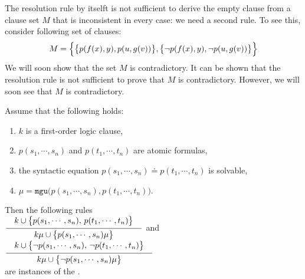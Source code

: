 The resolution rule by itselft is not sufficient to derive the empty clause from a clause set $M$ that is
inconsistent in every case: we need a second rule. To see this, consider following set of clauses:
\[ M = \Bigl\{ \bigl\{p(f(x),y), p(u,g(v))\bigr\}, 
               \bigl\{\neg p(f(x),y), \neg p(u,g(v))\bigr\} \Bigr\} 
\]
We will soon show that the set $M$ is contradictory. It can be shown that the resolution rule is not
sufficient to prove that $M$ is contradictory.
However, we will soon see that $M$ is contradictory. 

\begin{Definition} 
  Assume that the following holds:
  \begin{enumerate}
  \item $k$ is a first-order logic clause,
  \item $p(s_1,\cdots,s_n)$ and $p(t_1,\cdots,t_n)$ are atomic formulas,
  \item the syntactic equation $p(s_1,\cdots,s_n) \doteq p(t_1,\cdots,t_n)$ is solvable,
  \item $\mu = \mathtt{mgu}\bigl(p(s_1,\cdots,s_n), p(t_1,\cdots,t_n)\bigr)$.
  \end{enumerate}
  Then the following rules \\[0.3cm]
  \hspace*{0.8cm}
  $\schluss{k \cup \bigl\{p(s_1,\cdots,s_n),\, p(t_1,\cdots,t_n)\bigl\}}{k\mu \cup \bigl\{p(s_1,\cdots,s_n)\mu\bigr\} }$ 
  \quad and \quad
  $\schluss{k \cup \bigl\{ \neg p(s_1,\cdots,s_n),\, \neg p(t_1,\cdots,t_n)\bigl\}}{k\mu \cup \bigl\{\neg p(s_1,\cdots,s_n)\mu\bigr\} }$ 
  \\[0.3cm]
  are instances of the .
  \eox
\end{Definition}

